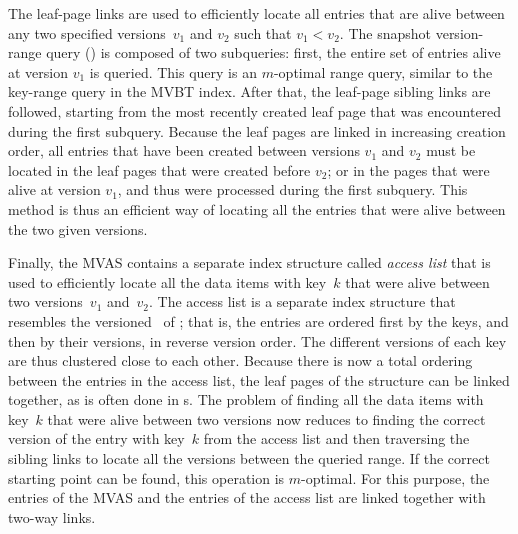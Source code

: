 The leaf-page links are used to efficiently locate all entries that are alive
between any two specified versions~$v_1$ and $v_2$ such that $v_1 < v_2$.
The snapshot version-range query () is composed of two
subqueries: first, the entire set of entries alive at version $v_1$ is
queried.
This query is an $m$-optimal range query, similar to the key-range query
in the MVBT index. 
After that, the leaf-page sibling links are followed, starting from the
most recently created leaf page that was encountered during the first
subquery.
Because the leaf pages are linked in increasing creation order, all entries
that have been created between versions $v_1$ and $v_2$ must be located in
the leaf pages that were created before $v_2$; or in the pages that were
alive at version $v_1$, and thus were processed during the first subquery.
This method is thus an efficient way of locating all the entries that were
alive between the two given versions.

Finally, the MVAS contains a separate index structure called \emph{access
list} that is used to efficiently locate all the data items with key~$k$
that were alive between two versions~$v_1$ and~$v_2$.
The access list is a separate index structure that resembles the versioned
\Btree\ of ; that is, the entries are ordered
first by the keys, and then by their versions, in reverse version
order.
The different versions of each key are thus clustered close to each other. 
Because there is now a total ordering between the entries in the access list,
the leaf pages of the structure can be linked together, as is often done in
\Btree{}s.
The problem of finding all the data items with key~$k$ that were alive
between two versions now reduces to finding the correct version of the entry
with key~$k$ from the access list and then traversing the sibling links to
locate all the versions between the queried range.
If the correct starting point can be found, this operation is $m$-optimal.
For this purpose, the entries of the MVAS and the entries of the access list
are linked together with two-way links.

